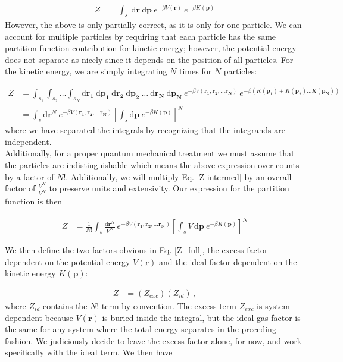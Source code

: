 \documentclass[12pt]{article}
\newcommand*{\diff}{\mathrm{d}}
\begin{document}
\begin{align}
    Z &= \int_s~ \diff\mathbf{r}~ \diff\mathbf{p} ~e^{-\beta V(\mathbf{r})}~e^{-\beta K(\mathbf{p})}
\end{align} 
However, the above is only partially correct, as it is only for one particle. We can account for multiple particles by requiring that each particle has the same partition function contribution for kinetic energy; however, the potential energy does not separate as nicely since it depends on the position of all particles. For the kinetic energy, we are simply integrating $N$ times for $N$ particles:

\begin{align}
    Z &= \int_{s_1} \int_{s_2} \dots \int_{s_N} \diff\mathbf{r_1}~ \diff\mathbf{p_1} ~\diff\mathbf{r_2} ~\diff\mathbf{p_2} ~\dots ~\diff\mathbf{r_N}~ \diff\mathbf{p_N} ~e^{-\beta V(\mathbf{r_1}, \mathbf{r_2}, \dots \mathbf{r_N})}~e^{-\beta(K(\mathbf{p_1}) + K(\mathbf{p_2}) ... K(\mathbf{p_N}))}\\
    &= \int_s \diff\mathbf{r}^N ~e^{-\beta V(\mathbf{r_1}, \mathbf{r_2}, \dots \mathbf{r_N})} \left[\int_s \diff\mathbf{p}~e^{-\beta K(\mathbf{p})}\right]^{N}
    \label{Z-intermed}
\end{align}
where we have separated the integrals by recognizing that the integrands are independent.\\
Additionally, for a proper quantum mechanical treatment we must assume that the particles are indistinguishable which means the above expression over-counts by a factor of $N!$. Additionally, we will multiply Eq. \ref{Z-intermed} by an overall factor of $\frac{V^N}{V^N}$ to preserve units and extensivity. Our expression for the partition function is then 

\begin{align}
    Z &= \frac{1}{ N!}\int_s \frac{\diff\mathbf{r}^N}{V^N} ~e^{-\beta V(\mathbf{r_1}, \mathbf{r_2}, \dots \mathbf{r_N})} \left[\int_s V\,\diff\mathbf{p}~e^{-\beta K(\mathbf{p})}\right]^{N}
    \label{Z_full}
\end{align}

We then define the two factors obvious in Eq. \ref{Z_full}, the excess factor dependent on the potential energy $V(\mathbf{r})$ and the ideal factor dependent on the kinetic energy $K(\mathbf{p})$: 

\begin{align}
    Z &= (Z_{exc})(Z_{id}) \,,
\end{align}
where $Z_{id}$ contains the $N!$ term by convention. The excess term $Z_{exc}$ is system dependent because $V(\mathbf{r})$ is buried inside the integral, but the ideal gas factor is the same for any system where the total energy separates in the preceding fashion. We judiciously decide to leave the excess factor alone, for now, and work specifically with the ideal term. We then have
\end{document}

